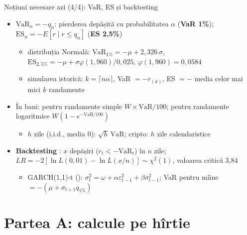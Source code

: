 \begin{frame}{Noțiuni necesare azi (4/4): VaR, ES și backtesting}
\itemsize{\footnotesize}
\begin{itemize}
    \item $\mathrm{VaR}_\alpha = -q_\alpha$: pierderea depășită cu probabilitatea $\alpha$ (\textbf{VaR 1\%}); $\mathrm{ES}_\alpha = -E[r \mid r \le q_\alpha]$ (\textbf{ES 2,5\%})
    \begin{itemize}
        \item distribuția Normală: $\mathrm{VaR}_{1\%} = -\mu + 2{,}326\,\sigma$, $\mathrm{ES}_{2,5\%} = -\mu + \sigma\varphi(1{,}960)/0{,}025$, $\varphi(1{,}960) = 0{,}0584$
        \item simularea istorică: $k = \lceil n\alpha\rceil$, VaR $= -r_{(k)}$, ES $= -$ media celor mai mici $k$ randamente
    \end{itemize}
    \item În bani: pentru randamente simple $W \times \mathrm{VaR}/100$; pentru randamente logaritmice $W(1 - e^{-\mathrm{VaR}/100})$
    \begin{itemize}
        \item $h$ zile (i.i.d., media 0): $\sqrt{h}\,\mathrm{VaR}$; cripto: $h$ zile calendaristice
    \end{itemize}
    \item \textbf{Backtesting} : $x$ depășiri ($r_t < -\mathrm{VaR}_t$) în $n$ zile; $LR = -2[\ln L(0{,}01) - \ln L(x/n)] \sim \chi^2(1)$, valoarea critică 3,84
    \begin{itemize}
        \item GARCH(1,1)-t (): $\sigma_t^2 = \omega + \alpha\varepsilon_{t-1}^2 + \beta\sigma_{t-1}^2$; VaR pentru mîine $= -(\mu + \sigma_{t+1}q_{1\%})$
    \end{itemize}
\end{itemize}
\end{frame}


\section{Partea A: calcule pe hîrtie}


